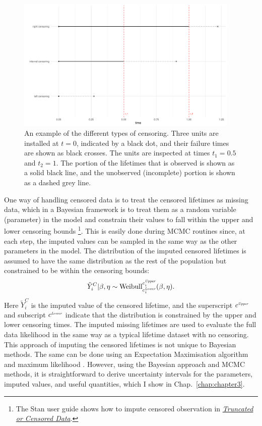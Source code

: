 \begin{figure}
    \centering
    \includegraphics[width=0.95\textwidth]{./figures/ch-2/censoring_example.pdf}
    \caption{An example of the different types of censoring. Three units are installed at $t = 0$, indicated by a black dot, and their failure times are shown as black crosses. The units are inspected at times $t_1 = 0.5$ and $t_2 = 1$. The portion of the lifetimes that is observed is shown as a solid black line, and the unobserved (incomplete) portion is shown as a dashed grey line.}
    \label{fig:cense_examp}
\end{figure}

One way of handling censored data is to treat the censored lifetimes as missing data, which in a Bayesian framework is to treat them as a random variable (parameter) in the model \citep[p.~211]{reich2019} and constrain their values to fall within the upper and lower censoring bounds \citep{stan_user_guide2024}\footnote{The Stan user guide shows how to impute censored observation in \href{https://mc-stan.org/docs/stan-users-guide/truncation-censoring.html}{\textit{Truncated or Censored Data}}.}. This is easily done during MCMC routines since, at each step, the imputed values can be sampled in the same way as the other parameters in the model. The distribution of the imputed censored lifetimes is assumed to have the same distribution as the rest of the population but constrained to be within the censoring bounds:
\begin{equation}
    \label{eq:impute-cens}
    \tilde{Y}^C_i|\beta, \eta \sim \hbox{Weibull}^{c^{\textit{\tiny{Upper}}}_i}_{c^{\textit{\tiny{Lower}}}_i}(\beta, \eta).
\end{equation}
Here $\tilde{Y}^C_i$ is the imputed value of the censored lifetime, and the superscript $c^{\textit{\tiny{Upper}}}$ and subscript $c^{\textit{\tiny{Lower}}}$ indicate that the distribution is constrained by the upper and lower censoring times. The imputed missing lifetimes are used to evaluate the full data likelihood in the same way as a typical lifetime dataset with no censoring. This approach of imputing the censored lifetimes is not unique to Bayesian methods. The same can be done using an Expectation Maximisation algorithm and maximum likelihood \citep{mitra2013}. However, using the Bayesian approach and MCMC methods, it is straightforward to derive uncertainty intervals for the parameters, imputed values, and useful quantities, which I show in Chap.~\ref{chap:chapter3}.

